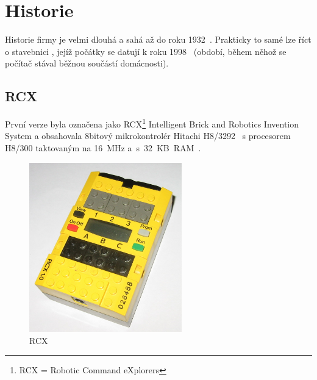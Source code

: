 \chapter{Historie \legoM}

Historie firmy \lego{ }je velmi dlouhá a sahá až do roku 1932~\cite{lego_GroupHistory1930s}. 
Prakticky to samé lze říct o stavebnici \legoM, jejíž počátky se datují k roku 1998~\cite{lego_mindstormsHistory} (období, během něhož se počítač stával běžnou součástí domácnosti).
% 
% 
% 
%
%
%
%


\section{\legoM{ }RCX}

První verze byla označena jako \legoM{ }RCX\footnote{RCX = Robotic Command eXplorers} Intelligent Brick and Robotics Invention System a  obsahovala 8bitový mikrokontrolér Hitachi H8/3292~\cite{hitachi_microcontrolerH8series} s procesorem H8/300 taktovaným na 16~MHz a~s~32~KB~RAM~\cite{legoMindstormsRCX_Manual}.
% 
% 
% 

\begin{figure}[h]
	\centering
	\includegraphics[width=250px]{images/lego-mindstorms-rcx_wikipedia.jpg}
	\caption[\legoM{ }RCX]{\legoM{ }RCX\protect\footnotemark}
	\label{fig:lego-mindstorms-rcx-wikipedia}
\end{figure}

